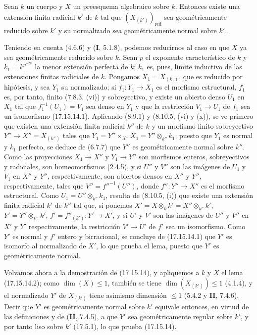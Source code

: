 \begin{lemma}[17.15.14.2]
\label{IV.17.15.14.2}
Sean $k$ un cuerpo y $X$ un preesquema algebraico sobre $k$. Entonces existe una extensión finita radicial $k'$ de $k$ tal que $(X_{(k')})_{\mathrm{red}}$ sea geométricamente reducido sobre $k'$ y su normalizado sea geométricamente normal sobre $k'$.
\end{lemma}

Teniendo en cuenta (4.6.6) y (\textbf I, 5.1.8), podemos reducirnos al caso en que $X$ ya sea geométricamente reducido sobre $k$. Sean $p$ el exponente característico de $k$ y $k_1=k^{p^{-\infty}}$ la menor extensión perfecta de $k$; $k_1$ es, pues, límite inductivo de las extensiones finitas radiciales de $k$. Pongamos $X_1=X_{(k_1)}$, que es reducido por hipótesis, y sea $Y_1$ su normalizado; si $f_1:Y_1\to X_1$ es el morfismo estructural, $f_1$ es, por tanto, finito (7.8.3, (vi)) y sobreyectivo, y existe un abierto denso $U_1$ en $X_1$ tal que $f_1^{-1}(U_1)=V_1$ sea denso en $Y_1$ y que la restricción $V_1\to U_1$ de $f_1$ sea un isomorfismo (17.15.14.1). Aplicando (8.9.1) y (8.10.5, (vi) y (x)), se ve primero que existen una extensión finita radicial $k''$ de $k$ y un morfismo finito sobreyectivo $Y''\to X''=X_{(k'')}$ tales que $Y_1=Y''\times_{X''}X_1=Y''\otimes_{k''}k_1$; puesto que $Y_1$ es normal y $k_1$ perfecto, se deduce de (6.7.7) que $Y''$ es geométricamente normal sobre $k''$. Como las proyecciones $X_1\to X''$ y $Y_1\to Y''$ son morfismos enteros, sobreyectivos y radiciales, son homeomorfismos (2.4.5), y si $U''$ y $V''$ son las imágenes de $U_1$ y $V_1$ en $X''$ y $Y''$, respectivamente, son abiertos densos en $X''$ y $Y''$, respectivamente, tales que $V''=f''^{-1}(U'')$, donde $f'':Y''\to X''$ es el morfismo estructural. Como $U_1=U''\otimes_{k''}k_1$, resulta de (8.10.5, (i)) que existe una extensión finita radicial $k'$ de $k''$ tal que, si ponemos $X'=X\otimes_k k'=X''\otimes_{k''}k'$, $Y'=Y''\otimes_{k''}k'$, $f'=f''_{(k')}:Y'\to X'$, y si $U'$ y $V'$ son las imágenes de $U''$ y $V''$ en $X'$ y $Y'$ respectivamente, la restricción $V'\to U'$ de $f'$ sea un isomorfismo. Como $Y'$ es normal y $f'$ entero y birracional, se concluye de (17.15.14.1) que $Y'$ es isomorfo al normalizado de $X'$, lo que prueba el lema, puesto que $Y'$ es geométricamente normal.

Volvamos ahora a la demostración de (17.15.14), y apliquemos a $k$ y $X$ el lema (17.15.14.2); como $\dim(X)\leq1$, también se tiene $\dim(X_{(k')})\leq1$ (4.1.4), y el normalizado $Y'$ de $X_{(k')}$ tiene asimismo dimensión $\leq1$ (5.4.2 y \textbf{II}, 7.4.6). Decir que $Y'$ es geométricamente normal sobre $k'$ equivale entonces, en virtud de las definiciones y de (\textbf{II}, 7.4.5), a que $Y'$ sea geométricamente regular sobre $k'$, y por tanto liso sobre $k'$ (17.5.1), lo que prueba (17.15.14).

